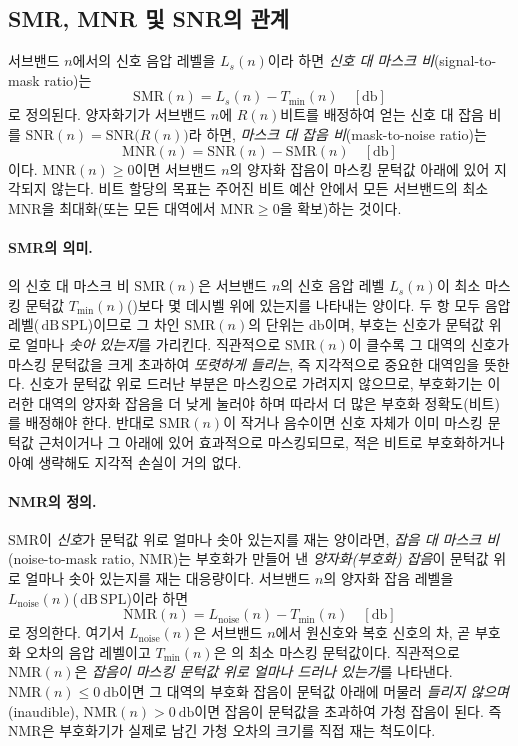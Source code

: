 \documentclass[11pt,a4paper]{article}
\newcommand{\dBSPL}{\ensuremath{\,\mathrm{dB\,SPL}}}  %
\newcommand{\SMR}{\mathrm{SMR}}                        %
\newcommand{\MNR}{\mathrm{MNR}}                        %
\newcommand{\NMR}{\mathrm{NMR}}                        %
\newcommand{\SNR}{\mathrm{SNR}}                        %
\begin{document}
\subsection{SMR, MNR 및 SNR의 관계}
서브밴드 $n$에서의 신호 음압 레벨을 $L_{s}(n)$이라 하면 \emph{신호 대 마스크
비}(signal-to-mask ratio)는
\begin{equation}\label{eq:smr}
  \SMR(n) = L_{s}(n) - T_{\min}(n) \quad [\si{\decibel}]
\end{equation}
로 정의된다. 양자화기가 서브밴드 $n$에 $R(n)$비트를 배정하여 얻는 신호 대 잡음
비를 $\SNR(n)=\SNR\bigl(R(n)\bigr)$라 하면, \emph{마스크 대 잡음 비}(mask-to-noise
ratio)는
\begin{equation}\label{eq:mnr}
  \MNR(n) = \SNR(n) - \SMR(n) \quad [\si{\decibel}]
\end{equation}
이다. $\MNR(n) \ge 0$이면 서브밴드 $n$의 양자화 잡음이 마스킹 문턱값 아래에 있어
지각되지 않는다. 비트 할당의 목표는 주어진 비트 예산 안에서 모든 서브밴드의
최소 $\MNR$을 최대화(또는 모든 대역에서 $\MNR \ge 0$을 확보)하는 것이다.

\paragraph{SMR의 의미.}
의 신호 대 마스크 비 $\SMR(n)$은 서브밴드 $n$의 신호 음압 레벨
$L_{s}(n)$이 최소 마스킹 문턱값 $T_{\min}(n)$()보다 몇 데시벨
위에 있는지를 나타내는 양이다. 두 항 모두 음압 레벨(\dBSPL)이므로 그 차인 $\SMR(n)$의
단위는 \si{\decibel}이며, 부호는 신호가 문턱값 위로 얼마나 \emph{솟아 있는지}를
가리킨다. 직관적으로 $\SMR(n)$이 클수록 그 대역의 신호가 마스킹 문턱값을 크게
초과하여 \emph{또렷하게 들리는}, 즉 지각적으로 중요한 대역임을 뜻한다. 신호가 문턱값
위로 드러난 부분은 마스킹으로 가려지지 않으므로, 부호화기는 이러한 대역의 양자화
잡음을 더 낮게 눌러야 하며 따라서 더 많은 부호화 정확도(비트)를 배정해야 한다.
반대로 $\SMR(n)$이 작거나 음수이면 신호 자체가 이미 마스킹 문턱값 근처이거나 그
아래에 있어 효과적으로 마스킹되므로, 적은 비트로 부호화하거나 아예 생략해도 지각적
손실이 거의 없다.

\paragraph{NMR의 정의.}
$\SMR$이 \emph{신호}가 문턱값 위로 얼마나 솟아 있는지를 재는 양이라면, \emph{잡음 대
마스크 비}(noise-to-mask ratio, NMR)는 부호화가 만들어 낸 \emph{양자화(부호화)
잡음}이 문턱값 위로 얼마나 솟아 있는지를 재는 대응량이다. 서브밴드 $n$의 양자화
잡음 레벨을 $L_{\mathrm{noise}}(n)$(\dBSPL)이라 하면
\begin{equation}\label{eq:nmr}
  \NMR(n) = L_{\mathrm{noise}}(n) - T_{\min}(n) \quad [\si{\decibel}]
\end{equation}
로 정의한다. 여기서 $L_{\mathrm{noise}}(n)$은 서브밴드 $n$에서 원신호와 복호 신호의
차, 곧 부호화 오차의 음압 레벨이고 $T_{\min}(n)$은 의 최소 마스킹
문턱값이다. 직관적으로 $\NMR(n)$은 \emph{잡음이 마스킹 문턱값 위로 얼마나 드러나
있는가}를 나타낸다. $\NMR(n) \le \SI{0}{\decibel}$이면 그 대역의 부호화 잡음이 문턱값
아래에 머물러 \emph{들리지 않으며}(inaudible), $\NMR(n) > \SI{0}{\decibel}$이면 잡음이
문턱값을 초과하여 가청 잡음이 된다. 즉 NMR은 부호화기가 실제로 남긴 가청 오차의
크기를 직접 재는 척도이다.
\end{document}
